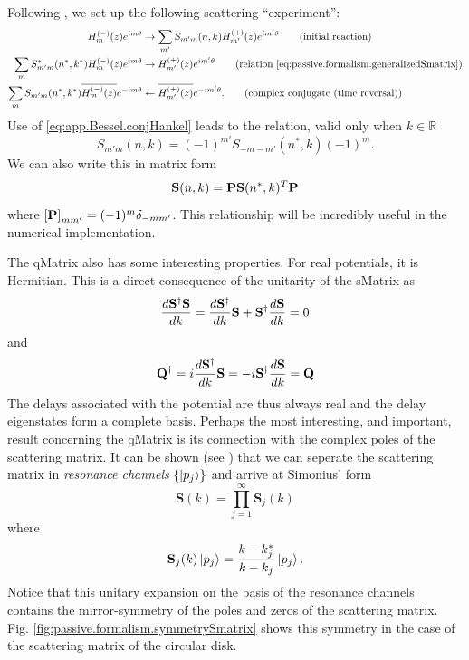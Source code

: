 Following \cite{GAP2013a}, we set up the following scattering
``experiment'':
  \begin{align*}
    H_m^{(-)}(z)e^{im\theta}					&\rightarrow \sum_{m'} S_{m'm}(n,k)H_{m'}^{(+)}(z)e^{im'\theta}	\tag{initial reaction}\\
    \sum_{m}S_{m'm}^*(n^*,k^*)H_m^{(-)}(z)e^{im\theta}		&\rightarrow H_{m'}^{(+)}(z)e^{im'\theta}			\tag{relation \eqref{eq:passive.formalism.generalizedSmatrix}}\\
    \sum_{m}S_{m'm}(n^*,k^*)\overline{H_m^{(-)}(z)}e^{-im\theta}&\leftarrow \overline{H_{m'}^{(+)}(z)}e^{-im'\theta}.		\tag{complex conjugate (time reversal)}
  \end{align*}
Use of \eqref{eq:app.Bessel.conjHankel}
leads to the relation, valid only when $k\in\mathbb{R}$
  \begin{equation}
    \label{eq:passive.formalism.timeReversalSymmetryReal}
    S_{m'm}(n,k) = (-1)^{m'}S_{-m-m'}(n^*,k)(-1)^m.
  \end{equation}
We can also write this in matrix form 
	\begin{equation}
		\mathbf{S}(n,k) = \mathbf{P}\mathbf{S}(n^*,k)^T\mathbf{P}
	\end{equation}
where $\left[\mathbf{P}\right]_{mm'} = (-1)^m\delta_{-mm'}$.
This relationship will be incredibly useful in the numerical implementation.

The \gls{qMatrix} also has some interesting properties. For real
potentials, it is Hermitian. This is a direct consequence of the
unitarity of the \gls{sMatrix} as 
  \begin{equation}
   \frac{d\mathbf{S}^\dagger\mathbf{S}}{dk} = \frac{d\mathbf{S}^\dagger}{dk}\mathbf{S}+\mathbf{S}^\dagger\frac{d\mathbf{S}}{dk} = 0
  \end{equation}
and
  \begin{equation}
   \mathbf{Q}^\dagger = i\frac{d\mathbf{S}^\dagger}{dk}\mathbf{S} = -i\mathbf{S}^\dagger\frac{d\mathbf{S}}{dk} = \mathbf{Q}
  \end{equation}
The delays associated with the potential are thus always real
and the delay eigenstates form a complete basis. Perhaps the
most interesting, and important, result concerning the 
\gls{qMatrix} is its connection with the complex poles of the
scattering matrix. It can be shown (see \cite{SHI2011,SHI2012,GAP2013a})
that we can seperate the scattering matrix in \textit{resonance channels} $\{\ket{p_j}\}$
and arrive at Simonius' form \cite{SIM1974}
  \begin{equation}
   \mathbf{S}(k)=\prod_{j=1}^\infty \mathbf{S}_j(k)
  \end{equation}
where
  \begin{equation}
   \mathbf{S}_j(k)\Ket{p_j} = \frac{k-k_j^*}{k-k_j}\Ket{p_j}.
  \end{equation}
Notice that this unitary expansion on the basis of the resonance
channels contains the mirror-symmetry of the poles and zeros of the 
scattering matrix. Fig. \ref{fig:passive.formalism.symmetrySmatrix}
shows this symmetry in the case of the scattering matrix of the circular
disk. 

